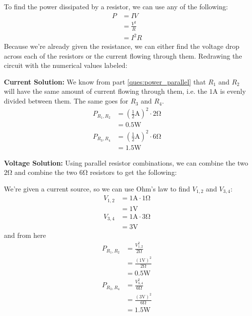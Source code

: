 \begin{enumerate}
{	To find the power dissipated by a resistor, we can use any of the following:
	\begin{align*}
		P &= IV\\
			&= \frac{V^2}{R}\\
			&= I^2R
	\end{align*}
	Because we're already given the resistance, we can either find the voltage drop across each of the resistors or the current flowing through them. Redrawing the circuit with the numerical values labeled:
	\begin{center}
		
	\end{center}
	\textbf{Current Solution:}
	We know from part \ref{ques:power_parallel} that $R_1$ and $R_2$ will have the same amount of current flowing through them, i.e. the $1\si{\ampere}$ is evenly divided between them. The same goes for $R_3$ and $R_4$.
	\begin{align*}
		P_{R_1, R_2} &= \left(\frac{1}{2}\si{\ampere}\right)^2 \cdot 2\si{\ohm}\\
			&= 0.5 \si{\watt}\\
		P_{R_3, R_4} &= \left(\frac{1}{2}\si{\ampere}\right)^2 \cdot 6\si{\ohm}\\
			&= 1.5 \si{\watt}
	\end{align*}

	\textbf{Voltage Solution:}
	Using parallel resistor combinations, we can combine the two $2\si{\ohm}$ and combine the two $6\si{\ohm}$ resistors to get the following:
	\begin{center}
		
	\end{center}
	We're given a current source, so we can use Ohm's law to find $V_{1,2}$ and $V_{3,4}$:
	\begin{align*}
		V_{1,2} &= 1\si{\ampere}\cdot1\si{\ohm}\\
			&= 1\si{\volt}\\
		V_{3,4} &= 1\si{\ampere}\cdot3\si{\ohm}\\
			&= 3\si{\volt}
	\end{align*}
	and from here
	\begin{align*}
		P_{R_1, R_2} &= \frac{V_{1, 2}^2}{2\si{\ohm}}\\
			&= \frac{(1\si{\volt})^2}{2\si{\ohm}}\\
			&= 0.5\si{\watt}\\
		P_{R_3, R_4} &= \frac{V_{3, 4}^2}{6\si{\ohm}}\\
			&= \frac{(3\si{\volt})^2}{6\si{\ohm}}\\
			&= 1.5\si{\watt}
	\end{align*}
}


\end{enumerate}
